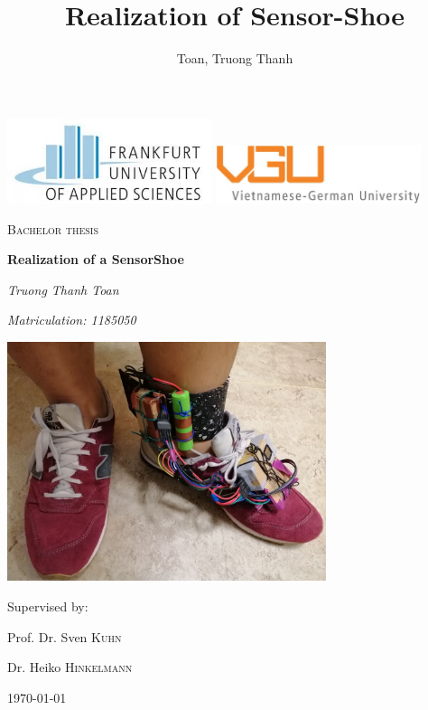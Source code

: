 \documentclass[12 pt, a4paper]{thesis}
\author{Toan, Truong Thanh}
\title{Realization of  Sensor-Shoe}
\begin{document}
\begin{titlepage}
	\centering
	\includegraphics[width=0.45\textwidth]{FRA_1.jpg}\hfill
	\includegraphics[width=0.45\textwidth]{VGU.jpg}\par\vspace{1cm}
	\vspace{1cm}
	{\scshape\Large Bachelor thesis\par}
	\vspace{1.5cm}
	{\huge\bfseries Realization of a SensorShoe\par}
	\vspace{2cm}
	{\Large\itshape Truong Thanh Toan\par}
	\vspace{1cm}
	{\Large\itshape Matriculation: 1185050\par}
	\vspace{1cm}
	\includegraphics[height = 70mm]{shoe.jpg}
	\vfill
	{\LARGE Supervised by:\par}\vspace{1cm}
	Prof. Dr. Sven \textsc{Kuhn}\par
	Dr. Heiko \textsc{Hinkelmann}

	\vfill

	{\large \today\par}
\end{titlepage}
\thispagestyle{empty}
\end{document}
